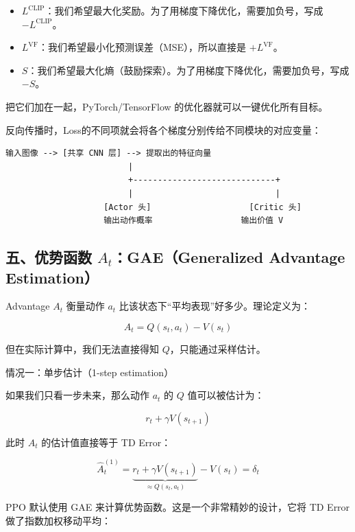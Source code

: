 \begin{itemize}
\tightlist
\item
  \(L^{\mathrm{CLIP}}\)：我们希望最大化奖励。为了用梯度下降优化，需要加负号，写成 \(-L^{\mathrm{CLIP}}\)。
\item
  \(L^{\mathrm{VF}}\)：我们希望最小化预测误差（MSE），所以直接是 \(+L^{\mathrm{VF}}\)。
\item
  \(S\)：我们希望最大化熵（鼓励探索）。为了用梯度下降优化，需要加负号，写成 \(-S\)。
\end{itemize}

把它们加在一起，PyTorch/TensorFlow 的优化器就可以一键优化所有目标。

反向传播时，Loss的不同项就会将各个梯度分别传给不同模块的对应变量：

\begin{verbatim}
输入图像 --> [共享 CNN 层] --> 提取出的特征向量
                         |
                         +-----------------------------+
                         |                             |
                    [Actor 头]                    [Critic 头]
                    输出动作概率                  输出价值 V
\end{verbatim}

\hypertarget{ux4e94ux4f18ux52bfux51fdux6570-a_tgaegeneralized-advantage-estimation}{%
\subsection{\texorpdfstring{五、优势函数 \(A_t\)：GAE（Generalized Advantage Estimation）}{五、优势函数 A\_t：GAE（Generalized Advantage Estimation）}}\label{ux4e94ux4f18ux52bfux51fdux6570-a_tgaegeneralized-advantage-estimation}}

Advantage \(A_t\) 衡量动作 \(a_t\) 比该状态下``平均表现''好多少。理论定义为：

\[
A_t=Q(s_t,a_t)-V(s_t)
\]

但在实际计算中，我们无法直接得知 \(Q\)，只能通过采样估计。

情况一：单步估计（1-step estimation）

如果我们只看一步未来，那么动作 \(a_t\) 的 \(Q\) 值可以被估计为：

\[
r_t+\gamma V(s_{t+1})
\]

此时 \(A_t\) 的估计值直接等于 TD Error：

\[
\hat{A}_t^{(1)}=\underbrace{r_t+\gamma V(s_{t+1})}_{\approx Q(s_t,a_t)}-V(s_t)=\delta_t
\]

PPO 默认使用 GAE 来计算优势函数。这是一个非常精妙的设计，它将 TD Error 做了指数加权移动平均：

